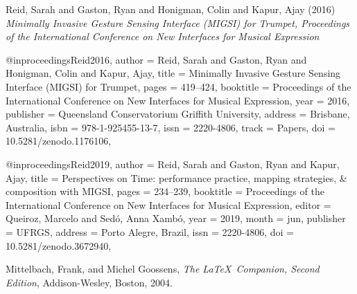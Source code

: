 
\begin{thebibliography}{99}

 Reid, Sarah and Gaston, Ryan and Honigman, Colin and Kapur, Ajay (2016) \emph{Minimally Invasive Gesture Sensing Interface (MIGSI) for Trumpet, Proceedings of the International Conference on New Interfaces for Musical Expression}

@inproceedings{Reid2016,
  author = {Reid, Sarah and Gaston, Ryan and Honigman, Colin and Kapur, Ajay},
  title = {Minimally Invasive Gesture Sensing Interface (MIGSI) for Trumpet},
  pages = {419--424},
  booktitle = {Proceedings of the International Conference on New Interfaces for Musical Expression},
  year = {2016},
  publisher = {Queensland Conservatorium Griffith University},
  address = {Brisbane, Australia},
  isbn = {978-1-925455-13-7},
  issn = {2220-4806},
  track = {Papers},
  doi = {10.5281/zenodo.1176106},
}

@inproceedings{Reid2019,
  author = {Reid, Sarah and Gaston, Ryan and Kapur, Ajay},
  title = {Perspectives on Time: performance practice, mapping strategies, \& composition with {MIGSI}},
  pages = {234--239},
  booktitle = {Proceedings of the International Conference on New Interfaces for Musical Expression},
  editor = {Queiroz, Marcelo and Sedó, Anna Xambó},
  year = {2019},
  month = jun,
  publisher = {UFRGS},
  address = {Porto Alegre, Brazil},
  issn = {2220-4806},
  doi = {10.5281/zenodo.3672940},
}


 Mittelbach, Frank, and Michel Goossens,
{\em The \LaTeX\  Companion, Second Edition},
Addison-Wesley, Boston, 2004.


\end{thebibliography}